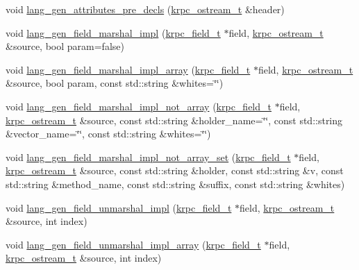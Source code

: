 \begin{DoxyCompactItemize}
\item 
void \hyperlink{classkrpc__gen__cpp__t_a50a7df53dc90e3e7b4a90c41f2747ba5}{lang\+\_\+gen\+\_\+attributes\+\_\+pre\+\_\+decls} (\hyperlink{classkrpc__ostream__t}{krpc\+\_\+ostream\+\_\+t} \&header)
\item 
void \hyperlink{classkrpc__gen__cpp__t_a2b2a24d2a1d0e1f11ce39e9acf45825b}{lang\+\_\+gen\+\_\+field\+\_\+marshal\+\_\+impl} (\hyperlink{classkrpc__field__t}{krpc\+\_\+field\+\_\+t} $\ast$field, \hyperlink{classkrpc__ostream__t}{krpc\+\_\+ostream\+\_\+t} \&source, bool param=false)
\item 
void \hyperlink{classkrpc__gen__cpp__t_aae93d37afaca6f5fc0fcf72d58103161}{lang\+\_\+gen\+\_\+field\+\_\+marshal\+\_\+impl\+\_\+array} (\hyperlink{classkrpc__field__t}{krpc\+\_\+field\+\_\+t} $\ast$field, \hyperlink{classkrpc__ostream__t}{krpc\+\_\+ostream\+\_\+t} \&source, bool param, const std\+::string \&whites=\char`\"{}\char`\"{})
\item 
void \hyperlink{classkrpc__gen__cpp__t_a1b7b7d7c1d22bd747dc6b83e5934ef4d}{lang\+\_\+gen\+\_\+field\+\_\+marshal\+\_\+impl\+\_\+not\+\_\+array} (\hyperlink{classkrpc__field__t}{krpc\+\_\+field\+\_\+t} $\ast$field, \hyperlink{classkrpc__ostream__t}{krpc\+\_\+ostream\+\_\+t} \&source, const std\+::string \&holder\+\_\+name=\char`\"{}\char`\"{}, const std\+::string \&vector\+\_\+name=\char`\"{}\char`\"{}, const std\+::string \&whites=\char`\"{}\char`\"{})
\item 
void \hyperlink{classkrpc__gen__cpp__t_a4a2b308cb95e57d230c01a50e51fd110}{lang\+\_\+gen\+\_\+field\+\_\+marshal\+\_\+impl\+\_\+not\+\_\+array\+\_\+set} (\hyperlink{classkrpc__field__t}{krpc\+\_\+field\+\_\+t} $\ast$field, \hyperlink{classkrpc__ostream__t}{krpc\+\_\+ostream\+\_\+t} \&source, const std\+::string \&holder, const std\+::string \&v, const std\+::string \&method\+\_\+name, const std\+::string \&suffix, const std\+::string \&whites)
\item 
void \hyperlink{classkrpc__gen__cpp__t_a64c1c27d978771347894e34ddd4b3499}{lang\+\_\+gen\+\_\+field\+\_\+unmarshal\+\_\+impl} (\hyperlink{classkrpc__field__t}{krpc\+\_\+field\+\_\+t} $\ast$field, \hyperlink{classkrpc__ostream__t}{krpc\+\_\+ostream\+\_\+t} \&source, int index)
\item 
void \hyperlink{classkrpc__gen__cpp__t_a47869db09ee0e994a11ca8a0dd58e17c}{lang\+\_\+gen\+\_\+field\+\_\+unmarshal\+\_\+impl\+\_\+array} (\hyperlink{classkrpc__field__t}{krpc\+\_\+field\+\_\+t} $\ast$field, \hyperlink{classkrpc__ostream__t}{krpc\+\_\+ostream\+\_\+t} \&source, int index)

\end{DoxyCompactItemize}
